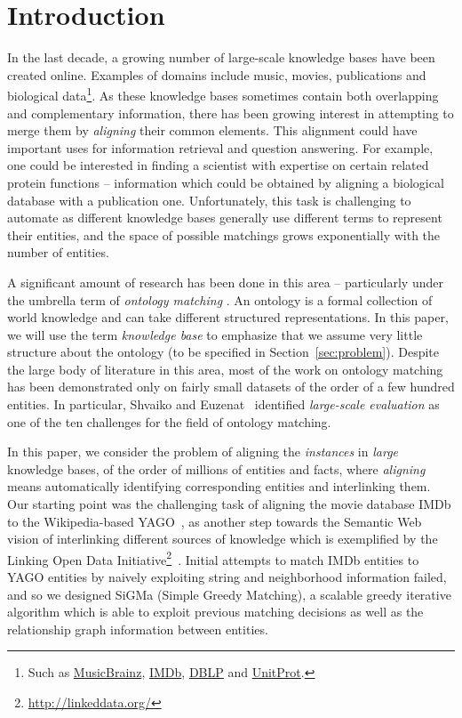 \documentclass{sig-alternate}
\begin{document}
%
%
%
%
%
%
%
%
%
%
%

\section{Introduction}
In the last decade, a growing number of large-scale knowledge bases have been created online. Examples of domains include
music, movies, publications and biological data\footnote{Such as \href{http://musicbrainz.org/}{MusicBrainz}, \href{http://www.imdb.com/}{IMDb}, \href{http://www.informatik.uni-trier.de/~ley/db}{DBLP} and \href{http://www.uniprot.org/}{UnitProt}.}. As these knowledge bases sometimes contain both overlapping and complementary information, there has been growing interest in attempting to merge them by \emph{aligning} their common elements. This alignment could have important uses for information retrieval and question answering. For example, one could be interested in finding a scientist with expertise on certain related protein functions -- information which could be obtained by aligning a biological database with a publication one. Unfortunately, this task is challenging to automate as different knowledge bases generally use different terms to represent their entities, and the space of possible matchings grows exponentially with the number of entities.

A significant amount of research has been done in this area -- particularly under the umbrella term of \emph{ontology matching} \cite{choi06survey, kalfoglou03om-state-of-the-art, euzenat07om-book}. An ontology is a formal collection of world knowledge and can take different structured representations. In this paper, we will use the term \emph{knowledge base} to emphasize that we assume very little structure about the ontology (to be specified in Section~\ref{sec:problem}). Despite the large body of literature in this area, most of the work on ontology matching has been demonstrated only on fairly small datasets of the order of a few hundred entities. In particular, Shvaiko and Euzenat~\cite{shvaiko08challenges} identified \emph{large-scale evaluation} as one of the ten challenges for the field of ontology matching.

In this paper, we consider the problem of aligning the \emph{instances} in \emph{large} knowledge bases, of the order of millions of entities and facts, where \emph{aligning} means automatically identifying corresponding entities and interlinking them. Our starting point was the challenging task of aligning the movie database \textsf{IMDb} to the Wikipedia-based \textsf{YAGO}~\cite{suchanek2007WWW}, as another step towards the Semantic Web vision of interlinking different sources of knowledge which is exemplified by the Linking Open Data Initiative\footnote{\href{http://linkeddata.org/}{http://linkeddata.org/}}~\cite{lee08WWW}. Initial attempts to
match \textsf{IMDb} entities to \textsf{YAGO} entities by naively exploiting string and neighborhood information failed, and so we designed \textsf{SiGMa} (\textsf{Simple Greedy Matching}), a scalable greedy iterative algorithm which is able to exploit previous matching decisions as well as the relationship graph information between entities.
\end{document}
